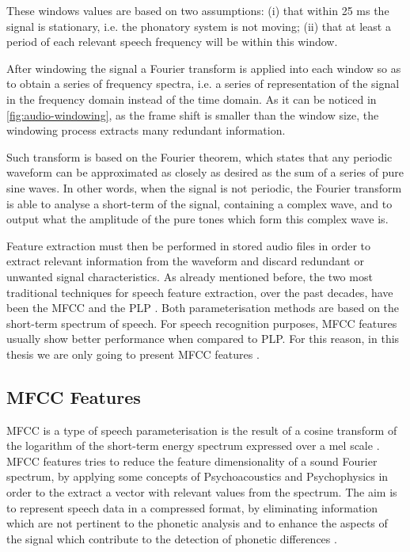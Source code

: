 These windows values are based on two assumptions: (i) that within 25 ms the signal is stationary, i.e.
the phonatory system is not moving; (ii) that at least a period of each relevant speech frequency will 
be within this window.

After windowing the signal a Fourier transform is applied into each window so as to obtain
a series of frequency spectra, i.e. a series of representation of the signal in the frequency domain instead of the time domain. As it can be noticed in \autoref{fig:audio-windowing}, as the frame shift is smaller than the window size, the windowing process extracts many redundant information. 

Such transform is based on the Fourier theorem, which states that any periodic waveform can be approximated as closely as desired as the sum of a series of pure sine waves. In other words, when the signal is not periodic,  the Fourier transform is able to analyse a short-term of the signal, containing a complex wave, and to output what the amplitude of the pure tones which form this complex wave is.

Feature extraction must then be performed in stored audio files in order to extract relevant information from the waveform and discard redundant or unwanted signal characteristics. As already mentioned before, the two most traditional techniques for speech feature extraction, over the past decades, have been the \ac{MFCC} \cite{Davis1980} and the \ac{PLP} \cite{Hermansky1990}. Both parameterisation methods are based on the short-term spectrum of speech. For speech recognition purposes, \ac{MFCC} features usually show better performance when compared to \ac{PLP}. For this reason, in this thesis we are only going to present \ac{MFCC} features \cite{Mporas2007}.

\subsection{MFCC Features}

\ac{MFCC} is a type of speech parameterisation is the result of a cosine transform of the logarithm of the short-term energy spectrum expressed over a mel scale \cite{Davis1980}. \ac{MFCC} features tries to reduce the feature dimensionality of a sound Fourier spectrum, by applying some concepts of Psychoacoustics and Psychophysics in order to the extract a vector with relevant values from the spectrum. The aim is to represent speech data in a compressed format, by eliminating information which are not pertinent to the phonetic analysis and to enhance the aspects of the signal which contribute to the detection of phonetic differences \cite{Davis1980}.

